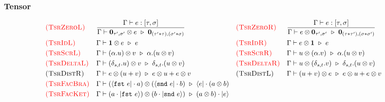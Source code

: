 \subsubsection*{Tensor}
\begin{align*}
  & \textcolor{red}{\textsc{(TsrZeroL)}} && 
  \frac{\Gamma \vdash e : [\tau, \sigma]}{\Gamma \vdash \textbf{0}_{\tau', \sigma'} \otimes e \ \triangleright\  \textbf{0}_{(\tau' * \tau), (\sigma' * \sigma)}} 
  && \textcolor{red}{\textsc{(TsrZeroR)}} && 
  \frac{\Gamma \vdash e : [\tau, \sigma]}{\Gamma \vdash e \otimes \textbf{0}_{\tau', \sigma'} \ \triangleright\  \textbf{0}_{(\tau * \tau'), (\sigma * \sigma')}} \\
  & \textcolor{red}{\textsc{(TsrIdL)}} && 
  \Gamma \vdash \mathbf{1} \otimes e \ \triangleright\  e
  && \textcolor{red}{\textsc{(TsrIdR)}} && 
  \Gamma \vdash e \otimes \mathbf{1} \ \triangleright\  e
  \\
  & \textcolor{red}{\textsc{(TsrScrL)}} && \Gamma \vdash (\alpha.u) \otimes v \ \triangleright\  \alpha.(u \otimes v) 
  && \textcolor{red}{\textsc{(TsrScrR)}} && \Gamma \vdash u \otimes (\alpha.v) \ \triangleright\  \alpha.(u \otimes v)
  \\
  & \textcolor{red}{\textsc{(TsrDeltaL)}} && \Gamma \vdash (\delta_{s, t}.u) \otimes v \ \triangleright\  \delta_{s, t}.(u \otimes v) 
  && \textcolor{red}{\textsc{(TsrDeltaR)}} && \Gamma \vdash u \otimes (\delta_{s, t}.v) \ \triangleright\  \delta_{s, t}.(u \otimes v)
  \\
  & \textsc{(TsrDistR)} && \Gamma \vdash e \otimes (u + v) \ \triangleright\  e \otimes u + e \otimes v
  && \textsc{(TsrDistL)} &&
  \Gamma \vdash (u + v) \otimes e \ \triangleright\  e \otimes u + e \otimes v \\
  & \textcolor{red}{\textsc{(TsrFacBra)}} && \Gamma \vdash (\langle \texttt{fst}\ e| \cdot a) \otimes (\langle \texttt{snd}\ e| \cdot b) \ \triangleright\  \langle e| \cdot (a \otimes b) \\
  & \textcolor{red}{\textsc{(TsrFacKet)}} && \Gamma \vdash (a \cdot |\texttt{fst}\ e\rangle) \otimes (b \cdot |\texttt{snd}\ e\rangle) \ \triangleright\  (a \otimes b) \cdot |e\rangle
\end{align*}
  
